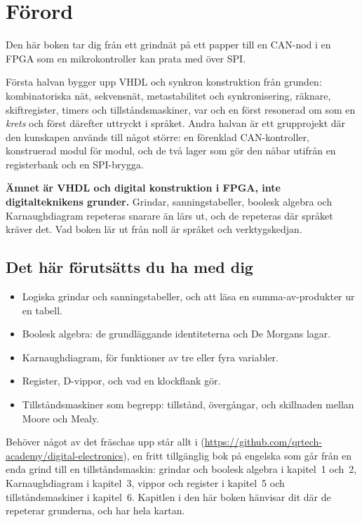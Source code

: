 
\chapter{Förord}

Den här boken tar dig från ett grindnät på ett papper till en CAN-nod i en FPGA som en
mikrokontroller kan prata med över SPI.

Första halvan bygger upp VHDL och synkron konstruktion från grunden: kombinatoriska nät,
sekvensnät, metastabilitet och synkronisering, räknare, skiftregister, timers och
tillståndsmaskiner, var och en först resonerad om som en \emph{krets} och först därefter uttryckt
i språket. Andra halvan är ett grupprojekt där den kunskapen används till något större: en
förenklad CAN-kontroller, konstruerad modul för modul, och de två lager som gör den nåbar utifrån
\textemdash{} en registerbank och en SPI-brygga.

\textbf{Ämnet är VHDL och digital konstruktion i FPGA, inte digitalteknikens grunder.} Grindar,
sanningstabeller, boolesk algebra och Karnaughdiagram repeteras snarare än lärs ut, och de
repeteras där språket kräver det. Vad boken lär ut från noll är språket och verktygskedjan.

\section*{Det här förutsätts du ha med dig}
\begin{itemize}
  \item Logiska grindar och sanningstabeller, och att läsa en summa-av-produkter ur en tabell.
  \item Boolesk algebra: de grundläggande identiteterna och De Morgans lagar.
  \item Karnaughdiagram, för funktioner av tre eller fyra variabler.
  \item Register, D-vippor, och vad en klockflank gör.
  \item Tillståndsmaskiner som begrepp: tillstånd, övergångar, och skillnaden mellan Moore och
    Mealy.
\end{itemize}

Behöver något av det fräschas upp står allt i \debook{}
(\url{https://github.com/qrtech-academy/digital-electronics}), en fritt tillgänglig bok på engelska
som går från en enda grind till en tillståndsmaskin: grindar och boolesk algebra i kapitel~1 och~2,
Karnaughdiagram i kapitel~3, vippor och register i kapitel~5 och tillståndsmaskiner i kapitel~6.
Kapitlen i den här boken hänvisar dit där de repeterar grunderna, och 
har hela kartan.

